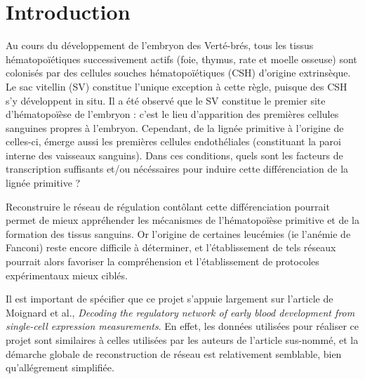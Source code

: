 \documentclass[fleqn,11pt]{SelfArx} %
\affiliation{\textsuperscript{1}\textit{Master 2 Bioinformatique et Modélisation, Université Paris 6, France}}
\affiliation{\textsuperscript{2}\textit{Institut Curie, France}}
\begin{document}
\flushbottom %
\maketitle


\tableofcontents 

\thispagestyle{empty} 


\section*{Introduction}
Au cours du développement de l'embryon des Verté-brés, tous les tissus hématopoïétiques successivement actifs (foie, thymus, rate et moelle osseuse) sont colonisés par des cellules souches hématopoïétiques (CSH) d'origine extrinsèque. Le sac vitellin (SV) constitue l'unique exception à cette règle, puisque des CSH s'y développent in situ. Il a été observé que le SV constitue le premier site d'hématopoïèse de l'embryon\cite{Cumano} : c'est le lieu d'apparition des premières cellules sanguines propres à l'embryon. Cependant, de la lignée primitive à l'origine de celles-ci, émerge aussi les premières cellules endothéliales (constituant la paroi interne des vaisseaux sanguins). Dans ces conditions, quels sont les facteurs de transcription suffisants et/ou nécéssaires pour induire cette différenciation de la lignée primitive ?

\par Reconstruire le réseau de régulation contôlant cette différenciation pourrait permet de mieux appréhender les mécanismes de l'hématopoïèse primitive et de la formation des tissus sanguins. Or l'origine de certaines leucémies (ie l'anémie de Fanconi\cite{Fanconi}) reste encore difficile à déterminer, et l'établissement de tels réseaux pourrait alors favoriser la compréhension et l'établissement de protocoles expérimentaux mieux ciblés. 
 
\par Il est important de spécifier que ce projet s'appuie largement sur l'article de Moignard et al., \textit{Decoding the regulatory network of early blood development from single-cell expression measurements}\cite{Moignard}. En effet, les données utilisées pour réaliser ce projet sont similaires à celles utilisées par les auteurs de l'article sus-nommé, et la démarche globale de reconstruction de réseau est relativement semblable, bien qu'allégrement simplifiée. 
\end{document}
